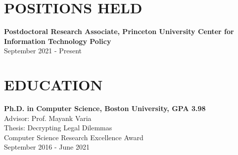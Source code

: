 \documentclass{res}
\begin{document}
 



\address{\texttt{sarah.ann.scheffler@gmail.com}\\\texttt{https://sarahscheffler.net}\\\texttt{https://github.com/sarahscheffler}}
\address{~~~~~~~~~~18 Vandeventer Ave \#1\\~~~~~~~~~~~~~~Princeton, NJ 08542\\~~~~~~~~~~~~~~~~~~~~\hspace{-0.049cm}(720) 234 - 6853}
                                  
\begin{resume}


%

    \vspace{0.1in}
\section{POSITIONS HELD}  
\vspace{0.1in}

    \textbf{Postdoctoral Research Associate, Princeton University Center for Information Technology Policy} \\
    September 2021 - Present

    \vspace{0.1in}
\section{EDUCATION}  
\vspace{0.1in}

    \textbf{Ph.D. in Computer Science, Boston University, GPA 3.98} \\
    Advisor: Prof. Mayank Varia \\
    Thesis: Decrypting Legal Dilemmas \\
    Computer Science Research Excellence Award \\
    September 2016 - June 2021


\end{resume}
\end{document}
